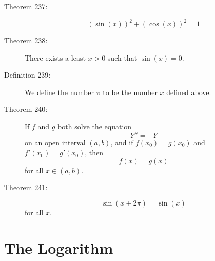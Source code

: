 \documentclass{article}
\begin{document}
\begin{description}
  \item[Theorem 237:]
    \begin{equation*}
    (\sin(x))^{2} + (\cos(x))^{2} = 1
    \end{equation*}

  \item[Theorem 238:] There exists a least $x > 0$ such that $\sin (x) = 0$.

  \item[Definition 239:] We define the number $\pi$ to be the number $x$ defined above.

  \item[Theorem 240:] If $f$ and $g$ both solve the equation
    \begin{equation*}
    Y'' = -Y
    \end{equation*}
    on an open interval $(a,b)$, and if $f(x_{0}) = g(x_{0})$ and $f' (x_{0}) = g' (x_{0})$, then
    \begin{equation*}
    f(x) = g(x)
    \end{equation*}
    for all $x \in (a,b)$.

  \item[Theorem 241:]
    \begin{equation*}
    \sin (x + 2\pi) = \sin (x)
    \end{equation*}
    for all $x$.

\end{description}



\newpage

\section{The Logarithm}
\end{document}
